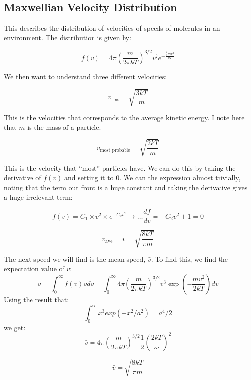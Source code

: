 \documentclass{article}
\begin{document}
\subsection{Maxwellian Velocity Distribution}

This describes the distribution of velocities of speeds of molecules in an environment. The distribution is given by:

\begin{equation}
    \boxed{f(v) = 4 \pi \left(\frac{m}{2 \pi k T}\right)^{3/2} v^2 e^{-\frac{\frac{1}{2} m v^2}{ kT}}}
\end{equation}

We then want to understand three different velocities:

\begin{equation}
    \boxed{v_{\text{rms}} = \sqrt{\frac{3 k T}{m}}}
\end{equation}

This is the velocities that corresponds to the average kinetic energy. I note here that $m$ is the mass of a particle.

\begin{equation}
    \boxed{v_{\text{most probable}} = \sqrt{\frac{2k T}{m}}}
\end{equation}

This is the velocity that ``most'' particles have. We can do this by taking the derivative of $f(v)$ and setting it to $0$. We can the expression almost trivially, noting that the term out front is a huge constant and taking the derivative gives a huge irrelevant term:

\begin{equation}
    f(v) = C_1 \times v^2 \times e^{-C_2 v^2} \rightarrow \dots \frac{df}{dv} = -C_2 v^2 + 1 = 0
\end{equation}

\begin{equation}
    v_{\text{ave}} = \bar{v} = \sqrt{\frac{8 k T}{\pi m}}
\end{equation}

The next speed we will find is the mean speed, $\bar{v}$. To find this, we find the expectation value of $v$:
$$ \bar{v} = \int_0^{\infty} f(v) v dv = \int_0^{\infty} 4\pi \left( \frac{m}{ 2 \pi kT} \right)^{3/2} v^3 \exp\left(-\frac{mv^2}{2kT}\right) dv$$
Using the result that:
$$ \int_0^\infty x^3 exp(-x^2/a^2) = a^4/2 $$
we get:
$$\bar{v} = 4\pi \left( \frac{m}{ 2 \pi kT} \right)^{3/2} \frac{1}{2} \left(\frac{2kT}{m}\right)^2 $$

\begin{equation}
    \boxed{\bar{v} = \sqrt{\frac{8 kT}{\pi m}}}
\end{equation}
\end{document}
